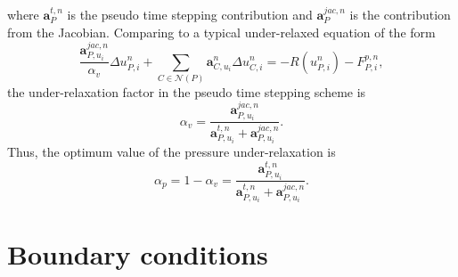 where $\boldsymbol{a}_{P}^{t,n}$ is the pseudo time stepping contribution and $\boldsymbol{a}_{P}^{jac,n}$ is the contribution from the Jacobian. Comparing to a typical under-relaxed equation of the form 
\begin{equation*}
\frac{\boldsymbol{a}_{P,u_i}^{jac,n}}{\alpha_v}\Delta u_{P,i}^n+\sum_{C \in \mathcal{N}(P)} \mathbf{a}_{C,u_i}^n\Delta u_{C,i}^n=-R(u_{P,i}^{n})-F_{P,i}^{p,n},
\end{equation*}
the under-relaxation factor in the pseudo time stepping scheme is
\begin{equation}
\alpha_v = \frac{\boldsymbol{a}_{P,u_i}^{jac,n}}{\boldsymbol{a}_{P,u_i}^{t,n} + \boldsymbol{a}_{P,u_i}^{jac,n}}.
\end{equation}
Thus, the optimum value of the pressure under-relaxation is
\begin{equation}
\alpha_p = 1 - \alpha_v = \frac{\boldsymbol{a}_{P,u_i}^{t,n}}{\boldsymbol{a}_{P,u_i}^{t,n} + \boldsymbol{a}_{P,u_i}^{jac,n}}.
\end{equation}


\section{Boundary conditions}

